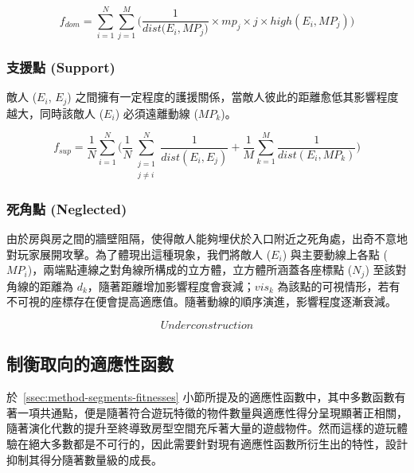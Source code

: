 \begin{equation}
f_{dom}=\sum_{i=1}^{N} \sum_{j=1}^{M} \Big( \frac{1}{dist\big(E_{i}, MP_{j}\big)} \times mp_{j} \times j \times high(E_{i}, MP_{j}) \Big)
\end{equation}

\subsubsection{支援點 (Support)}
\label{sssec:method-segments-fitnesses-support}

敵人 ($E_{i}$, $E_{j}$) 之間擁有一定程度的護援關係，當敵人彼此的距離愈低其影響程度越大，同時該敵人 ($E_{i}$) 必須遠離動線 ($MP_{k}$)。

\begin{equation}
f_{sup}=\frac{1}{N} \sum_{i=1}^{N} \bigg( \frac{1}{N} \sum_{\substack{j=1 \\ j \neq i}}^{N} \frac{1}{dist(E_{i}, E_{j})} + \frac{1}{M} \sum_{k=1}^{M} \frac{1}{dist(E_{i}, MP_{k})} \bigg)
\end{equation}

\subsubsection{死角點 (Neglected)}
\label{sssec:method-segments-fitnesses-neglected}

由於房與房之間的牆壁阻隔，使得敵人能夠埋伏於入口附近之死角處，出奇不意地對玩家展開攻擊。為了體現出這種現象，我們將敵人 ($E_{i}$) 與主要動線上各點 ($MP_{i}$)，兩端點連線之對角線所構成的立方體，立方體所涵蓋各座標點 ($N_{j}$) 至該對角線的距離為 $d_{k}$，隨著距離增加影響程度會衰減；$vis_{k}$ 為該點的可視情形，若有不可視的座標存在便會提高適應值。隨著動線的順序演進，影響程度逐漸衰減。

\begin{equation}
Under construction
\end{equation}

\subsection{制衡取向的適應性函數}
\label{ssec:method-segments-balancefitness}

於~\ref{ssec:method-segments-fitnesses} 小節所提及的適應性函數中，其中多數函數有著一項共通點，便是隨著符合遊玩特徵的物件數量與適應性得分呈現顯著正相關，隨著演化代數的提升至終導致房型空間充斥著大量的遊戲物件。然而這樣的遊玩體驗在絕大多數都是不可行的，因此需要針對現有適應性函數所衍生出的特性，設計抑制其得分隨著數量級的成長。

